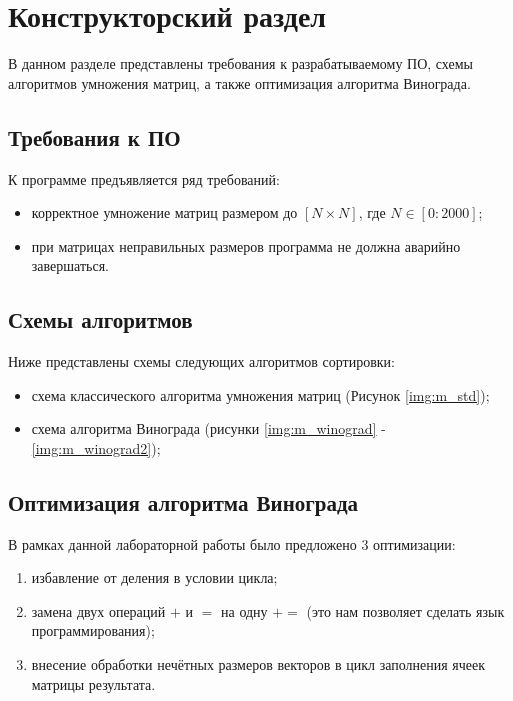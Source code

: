 \chapter{Конструкторский раздел}
В данном разделе представлены требования к разрабатываемому ПО, схемы алгоритмов умножения матриц, а также оптимизация алгоритма Винограда.

\section{Требования к ПО}

К программе предъявляется ряд требований:
\begin{itemize}
	\item корректное умножение матриц размером до $[N \times N]$, где $N\in[0:2000]$;
	\item при матрицах неправильных размеров программа не должна аварийно завершаться.
\end{itemize}

\section{Схемы алгоритмов}
Ниже представлены схемы следующих алгоритмов сортировки:
\begin{itemize}
	\item схема классического алгоритма умножения матриц (Рисунок \ref{img:m_std});
	\item схема алгоритма Винограда (рисунки \ref{img:m_winograd} - \ref{img:m_winograd2});
\end{itemize}

\section{Оптимизация алгоритма Винограда}
В рамках данной лабораторной работы было предложено 3 оптимизации:
\begin{enumerate}
	\item избавление от деления в условии цикла;
	\item замена двух операций $+$ и $=$ на одну $+=$ (это нам позволяет сделать язык программирования);
	\item внесение обработки нечётных размеров векторов в цикл заполнения ячеек матрицы результата.
\end{enumerate}

